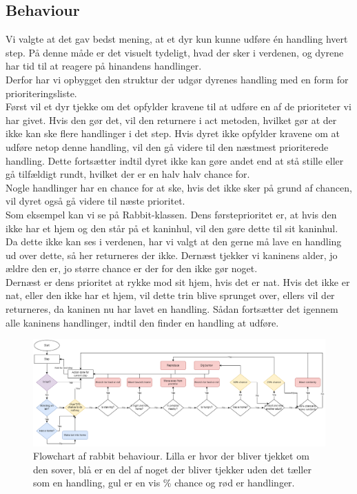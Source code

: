\documentclass[12pt]{article}
\begin{document}
    \subsection{Behaviour}
    Vi valgte at det gav bedst mening, at et dyr kun kunne udføre én handling hvert step. På denne måde er det visuelt tydeligt, hvad der sker i verdenen, og dyrene har tid til at reagere på hinandens handlinger.
\\Derfor har vi opbygget den struktur der udgør dyrenes handling med en form for prioriteringsliste.
\\Først vil et dyr tjekke om det opfylder kravene til at udføre en af de prioriteter vi har givet. Hvis den gør det, vil den returnere i act metoden, hvilket gør at der ikke kan ske flere handlinger i det step. Hvis dyret ikke opfylder kravene om at udføre netop denne handling, vil den gå videre til den næstmest prioriterede handling. Dette fortsætter indtil dyret ikke kan gøre andet end at stå stille eller gå tilfældigt rundt, hvilket der er en halv halv chance for.
\\Nogle handlinger har en chance for at ske, hvis det ikke sker på grund af chancen, vil dyret også gå videre til næste prioritet.
\\Som eksempel kan vi se på Rabbit-klassen. Dens førsteprioritet er, at hvis den ikke har et hjem og den står på et kaninhul, vil den gøre dette til sit kaninhul. Da dette ikke kan ses i verdenen, har vi valgt at den gerne må lave en handling ud over dette, så her returneres der ikke. Dernæst tjekker vi kaninens alder, jo ældre den er, jo større chance er der for den ikke gør noget.
\\Dernæst er dens prioritet at rykke mod sit hjem, hvis det er nat. Hvis det ikke er nat, eller den ikke har et hjem, vil dette trin blive sprunget over, ellers vil der returneres, da kaninen nu har lavet en handling. Sådan fortsætter det igennem alle kaninens handlinger, indtil den finder en handling at udføre.
\begin{figure}[H]
    \centering
    \includegraphics[width=1\columnwidth]{../BehaviourFlowchart.png}
    \caption{Flowchart af rabbit behaviour. Lilla er hvor der bliver tjekket om den sover, blå er en del af noget der bliver tjekker uden det tæller som en handling, gul er en vis \% chance og rød er handlinger.}  
\end{figure} 
\end{document}
